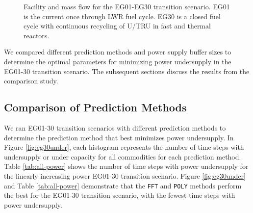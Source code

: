 \begin{figure}[]
	
    \caption{Facility and mass flow for the EG01-EG30 transition scenario.
    EG01 is the current once through LWR fuel cycle.
    EG30 is a closed fuel cycle 
    with continuous recycling of U/TRU in fast and thermal reactors.}
    \label{fig:30flow}
\end{figure}

We compared different prediction 
methods and power supply buffer sizes to determine the 
optimal \deploy parameters for minimizing
power undersupply in the EG01-30 \Cyclus 
transition scenario. 
The subsequent sections discuss the results from the comparison 
study. 

\subsection{Comparison of Prediction Methods}
We ran EG01-30 transition scenarios with different prediction 
methods to determine the prediction method that best minimizes 
power undersupply. 
In Figure \ref{fig:eg30under}, each histogram represents 
the number of time steps with undersupply or 
under capacity for all commodities for each prediction method.  
Table \ref{tab:all-power} shows the number of time steps with power 
undersupply for the linearly increasing power EG01-30 transition scenario. 
Figure \ref{fig:eg30under} and Table \ref{tab:all-power}
demonstrate that the \texttt{FFT} and \texttt{POLY} methods 
perform the best for the EG01-30 transition scenario, 
with the fewest time steps with power undersupply.


